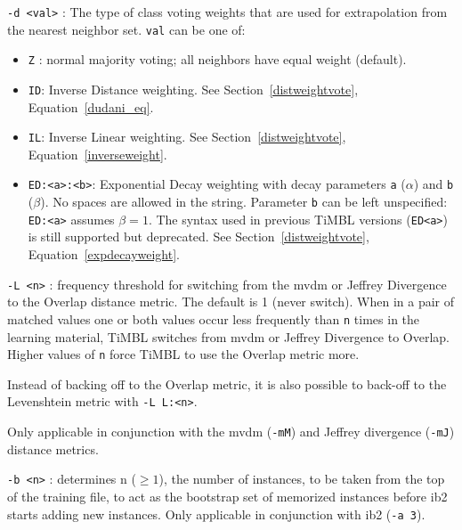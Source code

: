 \documentclass{report}
\begin{document}
\begin{description}
\item {\tt -d <val>} : The type of class voting weights that are used for
extrapolation from the nearest neighbor set. {\tt val} can be one of:
	\begin{itemize} 

  	\item {\tt Z} : normal majority voting; all neighbors have
         equal weight (default).

  	\item {\tt ID}: Inverse Distance weighting. See
  	Section~\ref{distweightvote}, Equation~\ref{dudani_eq}.

  	\item {\tt IL}: Inverse Linear weighting. See
  	Section~\ref{distweightvote}, Equation~\ref{inverseweight}.

  	\item {\tt ED:<a>:<b>}: Exponential Decay weighting with decay
  	parameters {\tt a} ($\alpha$) and {\tt b} ($\beta$). No spaces
  	are allowed in the string. Parameter {\tt b} can be left
  	unspecified: {\tt ED:<a>} assumes $\beta=1$. The syntax used
  	in previous TiMBL versions ({\tt ED<a>}) is still supported
  	but deprecated. See Section~\ref{distweightvote},
  	Equation~\ref{expdecayweight}.

\end{itemize}

\item {\tt -L <n>} : frequency threshold for switching from the {\sc
    mvdm} or Jeffrey Divergence to the Overlap distance metric. The
  default is 1 (never switch). When in a pair of matched values one or
  both values occur less frequently than {\tt n} times in the learning
  material, TiMBL switches from {\sc mvdm} or Jeffrey Divergence to
  Overlap. Higher values of {\tt n} force TiMBL to use the Overlap
  metric more. 

  Instead of backing off to the Overlap metric, it is also possible to
  back-off to the Levenshtein metric with {\tt -L L:<n>}.

  Only applicable in conjunction with the {\sc mvdm}
  ({\tt -mM}) and Jeffrey divergence ({\tt -mJ}) distance metrics.


\item {\tt -b <n>} : determines n ($\geq 1$), the number of instances,
to be taken from the top of the training file, to act as the bootstrap
set of memorized instances before {\sc ib2} starts adding new
instances. Only applicable in conjunction with {\sc ib2} ({\tt -a 3}).


\end{description}
\end{document}
